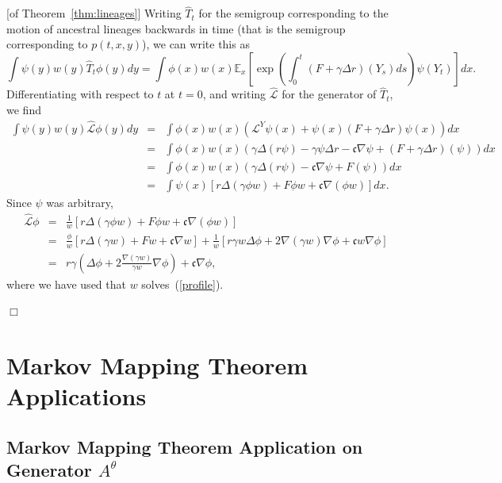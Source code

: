 \documentclass[12pt]{article}
\newenvironment {proof}{{\noindent\bf Proof }}{\hfill $\Box$ \medskip}
\def \hat{\widehat}
\newcommand{\IE}{\mathbb E}
\begin{document}
\begin{proof}[of Theorem~\ref{thm:lineages}]
Writing $\hat{T}_t$ for the semigroup corresponding to the motion of 
ancestral lineages backwards in time (that is the semigroup corresponding
to $p(t,x,y)$), we can write this as 
$$\int \psi(y)w(y)\hat{T}_t\phi(y)dy=\int\phi(x)w(x)
\IE_x\left[\exp\left(\int_0^t(F+\gamma\Delta r)(Y_s)ds\right)\psi(Y_t)\right]dx.$$
Differentiating with respect to $t$ at $t=0$, and writing 
$\hat{\mathcal L}$ for the generator of $\hat{T}_t$, we find
\begin{eqnarray*}
\int \psi(y)w(y)\widehat{\mathcal L}\phi(y)dy&=&
\int\phi(x)w(x)\left({\mathcal L}^Y\psi(x)+\psi(x)(F+\gamma\Delta r)\psi(x)\right)dx\\
&=&\int\phi(x)w(x)\left(\gamma\Delta(r\psi)-\gamma\psi\Delta r -\mathfrak{c}\nabla\psi 
+(F+\gamma\Delta r)(\psi)\right)dx\\
&=&\int\phi(x)w(x)\left(\gamma\Delta(r\psi)-\mathfrak{c}\nabla\psi+F(\psi)\right)dx\\
&=&
\int\psi(x)\left[r\Delta(\gamma \phi w)+F\phi w+\mathfrak{c}\nabla(\phi w)\right]dx.
\end{eqnarray*}
Since $\psi$ was arbitrary,
\begin{eqnarray*}
\hat{\mathcal L}\phi&=&\frac{1}{w}\left[ r\Delta (\gamma\phi w)+F\phi w
+\mathfrak{c}\nabla(\phi w)\right]\\
&=&\frac{\phi}{w}\left[r\Delta(\gamma w)+Fw+\mathfrak{c}\nabla w\right]
+\frac{1}{w}\left[r\gamma w\Delta \phi +2\nabla (\gamma w)
\nabla\phi+\mathfrak{c}w\nabla\phi\right]\\
&=&r\gamma\left(\Delta\phi+2\frac{\nabla(\gamma w)}{\gamma w}\nabla\phi\right)
+\mathfrak{c}\nabla\phi,
\end{eqnarray*}
where we have used that $w$ solves~(\ref{profile}).

\end{proof}
\newpage
\appendix
\section{Markov Mapping Theorem Applications}
    \label{sec: Markov Mapping Theorem Application}
\subsection{Markov Mapping Theorem Application on Generator $A^{\theta}$}\label{sec: Markov Mapping Theorem Application - Prelimit}
\end{document}
